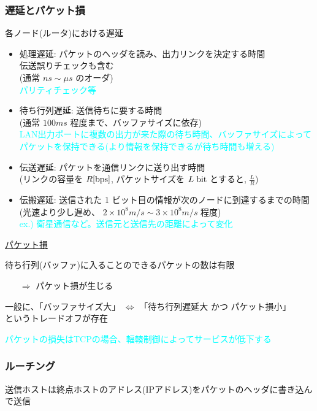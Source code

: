 \subsubsection{遅延とパケット損}

各ノード(ルータ)における遅延

\begin{itemize}
  \item 処理遅延: パケットのヘッダを読み、出力リンクを決定する時間\\
    伝送誤りチェックも含む\\
    (通常 $ns \sim \mu s$ のオーダ)\\
    \textcolor{cyan}{パリティチェック等}
  \item 待ち行列遅延: 送信待ちに要する時間\\
    (通常 $100ms$ 程度まで、バッファサイズに依存)\\
    \textcolor{cyan}{LAN出力ポートに複数の出力が来た際の待ち時間、バッファサイズによってパケットを保持できる(より情報を保持できるが待ち時間も増える)}
  \item 伝送遅延: パケットを通信リンクに送り出す時間\\
    (リンクの容量を $R[\rm{bps}]$, パケットサイズを $L\; \rm{bit}$ とすると, $\displaystyle \frac{L}{R}$)
  \item 伝搬遅延: 送信された 1 ビット目の情報が次のノードに到達するまでの時間\\
    (光速より少し遅め、 $2 \times 10^8 m/s \sim 3 \times 10^8 m/s$ 程度)\\
    \textcolor{cyan}{ex.) 衛星通信など。送信元と送信先の距離によって変化}
\end{itemize}
\underline{パケット損}

待ち行列(バッファ)に入ることのできるパケットの数は有限
\begin{itemize}
  \item[$\Rightarrow$] パケット損が生じる
\end{itemize}
一般に、「バッファサイズ大」 $\Leftrightarrow $ 「待ち行列遅延大 かつ パケット損小」\\
というトレードオフが存在

\textcolor{cyan}{パケットの損失はTCPの場合、輻輳制御によってサービスが低下する}


\subsubsection{ルーチング}

送信ホストは終点ホストのアドレス(IPアドレス)をパケットのヘッダに書き込んで送信

